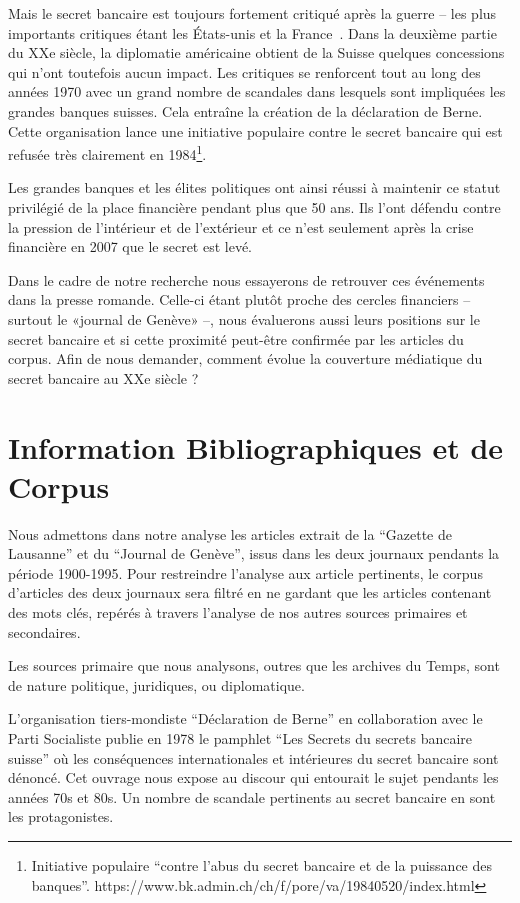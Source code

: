 \documentclass[11pt]{article}
\begin{document}
Mais le secret bancaire est toujours fortement critiqué après la guerre – les plus importants critiques étant les États-unis et la France~\citep[p. 503]{Mazbouri12}. Dans la deuxième partie du XXe siècle, la diplomatie américaine obtient de la Suisse
quelques concessions qui
n’ont toutefois aucun impact. Les critiques se renforcent tout au long des
années 1970 avec un grand nombre de scandales dans lesquels sont impliquées
les grandes banques suisses. Cela entraîne la création de la déclaration de
Berne. Cette organisation lance une initiative populaire contre le secret
bancaire qui est refusée très clairement en 1984\footnote{Initiative populaire
``contre l'abus du secret bancaire et de la puissance des banques''.
https://www.bk.admin.ch/ch/f/pore/va/19840520/index.html}.

Les grandes banques et les élites politiques ont ainsi réussi à maintenir ce
statut privilégié de la place financière pendant plus que 50 ans. Ils l’ont
défendu contre la pression de l’intérieur et de l’extérieur et ce n’est
seulement après la crise financière en 2007 que le secret est levé.

Dans le cadre de notre recherche nous essayerons de retrouver ces événements
dans la presse romande. Celle-ci étant plutôt proche des cercles financiers –
surtout le «journal de Genève» \citep{ConfClass1} –, nous évaluerons aussi
leurs positions sur le secret bancaire et si cette proximité peut-être
confirmée par les articles du corpus. Afin de nous demander, comment évolue la
couverture médiatique du secret bancaire au XXe siècle ? 

\section{Information Bibliographiques et de Corpus}
Nous admettons dans notre analyse les articles extrait de la “Gazette de
Lausanne” et du “Journal de Genève”, issus dans les deux journaux pendants la
période 1900-1995. Pour restreindre l’analyse aux article pertinents, le corpus
d’articles des deux journaux sera filtré en ne gardant que les articles
contenant des mots clés, repérés à travers l’analyse de nos autres sources
primaires et secondaires.

Les sources primaire que nous analysons, outres que les archives du Temps, sont
de nature politique, juridiques, ou diplomatique.

L’organisation tiers-mondiste “Déclaration de Berne” en collaboration avec le
Parti Socialiste publie en 1978 le pamphlet “Les Secrets du secrets bancaire
suisse” \citep{GiovanniniPierLuigi1978Lsds} où les conséquences internationales
et intérieures du secret bancaire sont dénoncé. Cet ouvrage nous expose au
discour qui entourait le sujet pendants les années 70s et 80s. Un nombre de
scandale pertinents au secret bancaire en sont les protagonistes.
\end{document}
